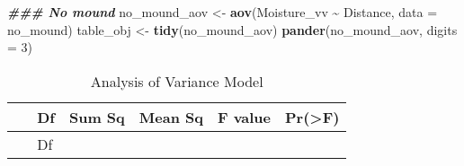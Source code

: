 \documentclass[
]{article}
\newenvironment{Shaded}{\begin{snugshade}}{\end{snugshade}}
\newcommand{\AttributeTok}[1]{\textcolor[rgb]{0.13,0.29,0.53}{#1}}
\newcommand{\DecValTok}[1]{\textcolor[rgb]{0.00,0.00,0.81}{#1}}
\newcommand{\DocumentationTok}[1]{\textcolor[rgb]{0.56,0.35,0.01}{\textbf{\textit{#1}}}}
\newcommand{\FunctionTok}[1]{\textcolor[rgb]{0.13,0.29,0.53}{\textbf{#1}}}
\newcommand{\NormalTok}[1]{#1}
\newcommand{\OtherTok}[1]{\textcolor[rgb]{0.56,0.35,0.01}{#1}}
\newcommand{\SpecialCharTok}[1]{\textcolor[rgb]{0.81,0.36,0.00}{\textbf{#1}}}
\begin{document}
\begin{Shaded}
\begin{Highlighting}[]
\DocumentationTok{\#\#\# No mound }
\NormalTok{no\_mound\_aov }\OtherTok{\textless{}{-}} \FunctionTok{aov}\NormalTok{(Moisture\_vv }\SpecialCharTok{\textasciitilde{}}\NormalTok{ Distance, }\AttributeTok{data =}\NormalTok{ no\_mound)}
\NormalTok{table\_obj }\OtherTok{\textless{}{-}} \FunctionTok{tidy}\NormalTok{(no\_mound\_aov)}
\FunctionTok{pander}\NormalTok{(no\_mound\_aov, }\AttributeTok{digits =} \DecValTok{3}\NormalTok{)}
\end{Highlighting}
\end{Shaded}

\begin{longtable}[]{@{}
  >{\centering\arraybackslash}p{}
  >{\centering\arraybackslash}p{}
  >{\centering\arraybackslash}p{}
  >{\centering\arraybackslash}p{}
  >{\centering\arraybackslash}p{}
  >{\centering\arraybackslash}p{}@{}}
\caption{Analysis of Variance Model}\tabularnewline
\toprule\noalign{}
\begin{minipage}[b]{\linewidth}\centering
~
\end{minipage} & \begin{minipage}[b]{\linewidth}\centering
Df
\end{minipage} & \begin{minipage}[b]{\linewidth}\centering
Sum Sq
\end{minipage} & \begin{minipage}[b]{\linewidth}\centering
Mean Sq
\end{minipage} & \begin{minipage}[b]{\linewidth}\centering
F value
\end{minipage} & \begin{minipage}[b]{\linewidth}\centering
Pr(\textgreater F)
\end{minipage} \\
\midrule\noalign{}
\endfirsthead
\toprule\noalign{}
\begin{minipage}[b]{\linewidth}\centering
~
\end{minipage} & \begin{minipage}[b]{\linewidth}\centering
Df
\end{minipage} & \begin{minipage}[b]{\linewidth}\centering

\end{minipage}
\end{longtable}
\end{document}
